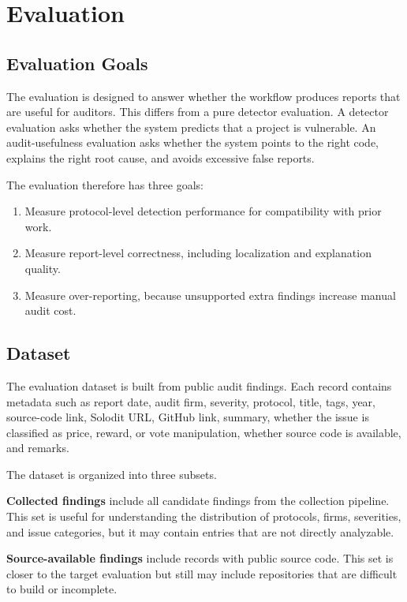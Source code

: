 
\chapter{Evaluation}

\section{Evaluation Goals}

The evaluation is designed to answer whether the workflow produces reports
that are useful for auditors. This differs from a pure detector evaluation. A
detector evaluation asks whether the system predicts that a project is
vulnerable. An audit-usefulness evaluation asks whether the system points to
the right code, explains the right root cause, and avoids excessive false
reports.

The evaluation therefore has three goals:

\begin{enumerate}
  \item Measure protocol-level detection performance for compatibility with
        prior work.
  \item Measure report-level correctness, including localization and
        explanation quality.
  \item Measure over-reporting, because unsupported extra findings increase
        manual audit cost.
\end{enumerate}

\section{Dataset}

The evaluation dataset is built from public audit findings. Each record
contains
metadata such as report date, audit firm, severity, protocol, title, tags,
year, source-code link, Solodit URL, GitHub link, summary, whether the issue is
classified as price, reward, or vote manipulation, whether source code is
available, and remarks.

The dataset is organized into three subsets.

\textbf{Collected findings} include all candidate findings from the collection
pipeline. This set is useful for understanding the distribution of protocols,
firms, severities, and issue categories, but it may contain entries that are
not directly analyzable.

\textbf{Source-available findings} include records with public source code.
This set is closer to the target evaluation but still may include repositories
that are difficult to build or incomplete.

